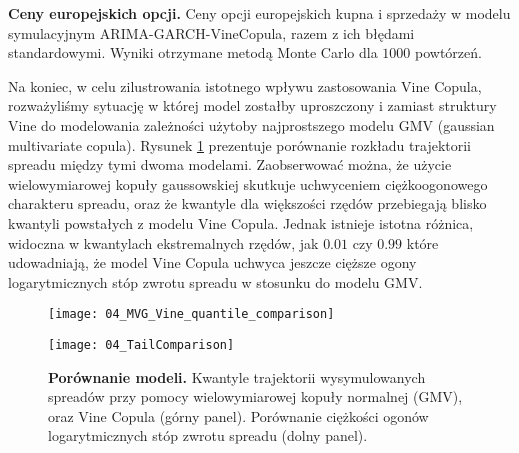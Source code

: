 \begin{table}
	\centering
	
	\caption{\textbf{Ceny europejskich opcji.} Ceny opcji europejskich kupna i sprzedaży w modelu symulacyjnym ARIMA-GARCH-VineCopula, razem z ich błędami standardowymi. Wyniki otrzymane metodą Monte Carlo dla $1000$ powtórzeń. \label{tab:option_prices}}
\end{table}

\FloatBarrier
Na koniec, w celu zilustrowania istotnego wpływu zastosowania Vine Copula, rozważyliśmy sytuację w której model zostałby uproszczony i zamiast struktury Vine do modelowania zależności użytoby najprostszego modelu GMV (gaussian multivariate copula). Rysunek \ref{fig:model_comparison} prezentuje porównanie rozkładu trajektorii spreadu między tymi dwoma modelami. Zaobserwować można, że użycie wielowymiarowej kopuły gaussowskiej skutkuje uchwyceniem ciężkoogonowego charakteru spreadu, oraz że kwantyle dla większości rzędów przebiegają blisko kwantyli powstałych z modelu Vine Copula. Jednak istnieje istotna różnica, widoczna w kwantylach ekstremalnych rzędów, jak $0.01$ czy $0.99$ które udowadniają, że model Vine Copula uchwyca jeszcze cięższe ogony logarytmicznych stóp zwrotu spreadu w stosunku do modelu GMV.
	
\begin{figure}[h]
	\centering
	\begin{minipage}{\linewidth}
	\centering
	\texttt{[image: 04\_MVG\_Vine\_quantile\_comparison]}
	\end{minipage}

	\begin{minipage}{\linewidth}
	\centering
	\texttt{[image: 04\_TailComparison]}
	\end{minipage}

	\caption{\textbf{Porównanie modeli.} Kwantyle trajektorii wysymulowanych spreadów przy pomocy wielowymiarowej kopuły normalnej (GMV), oraz Vine Copula (górny panel). Porównanie ciężkości ogonów logarytmicznych stóp zwrotu spreadu (dolny panel).\label{fig:model_comparison}}

\end{figure}
